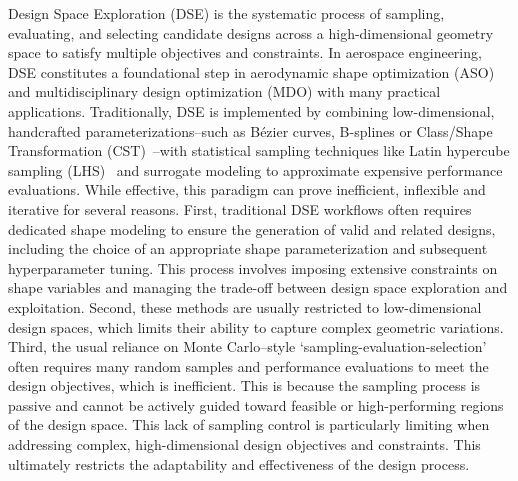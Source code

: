 Design Space Exploration (DSE) is the systematic process of sampling, evaluating, and selecting candidate designs across a high-dimensional geometry space to satisfy multiple objectives and constraints. In aerospace engineering, DSE constitutes a foundational step in aerodynamic shape optimization (ASO) and multidisciplinary design optimization (MDO) with many practical applications. Traditionally, DSE is implemented by combining low-dimensional, handcrafted parameterizations--such as Bézier curves, B-splines or Class/Shape Transformation (CST)~\cite{aa.Kulfan2008}--with statistical sampling techniques like Latin hypercube sampling (LHS)~\cite{ai.McKay1979} and surrogate modeling to approximate expensive performance evaluations. While effective, this paradigm can prove inefficient, inflexible and iterative for several reasons. First, traditional DSE workflows often requires dedicated shape modeling to ensure the generation of valid and related designs, including the choice of an appropriate shape parameterization and subsequent hyperparameter tuning. This process involves imposing extensive constraints on shape variables and managing the trade-off between design space exploration and exploitation. Second, these methods are usually restricted to low-dimensional design spaces, which limits their ability to capture complex geometric variations. Third, the usual reliance on Monte Carlo–style `sampling-evaluation-selection' often requires many random samples and performance evaluations to meet the design objectives, which is inefficient. This is because the sampling process is passive and cannot be actively guided toward feasible or high-performing regions of the design space. This lack of sampling control is particularly limiting when addressing complex, high-dimensional design objectives and constraints. This ultimately restricts the adaptability and effectiveness of the design process.

